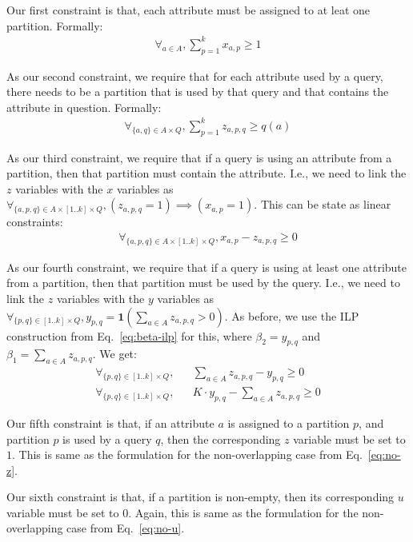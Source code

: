 Our first constraint is that, each attribute must be assigned to at leat one
partition. Formally:
\begin{eqnarray}
\forall_{a\in A}, \sum_{p=1}^{k} x_{a,p} \geq 1
\end{eqnarray}

As our second constraint, we require that for each attribute used by a query,
there needs to be a partition that is used by that query and that contains the
attribute in question. Formally:
\begin{eqnarray}
\forall_{\{a,q\}\in A\times Q}, \sum_{p=1}^{k} z_{a,p,q} \geq q(a) 
\end{eqnarray}

\begin{sloppypar}
As our third constraint, we require that if a query is using an attribute from
a partition, then that partition must contain the attribute. I.e., we need
to link the $z$ variables with the $x$ variables as
$\forall_{\{a,p,q\}\in A\times [1..k]\times Q}, (z_{a,p,q} = 1) \implies 
(x_{a,p} = 1)$. This can be state as linear constraints:
\begin{eqnarray}
\forall_{\{a,p,q\}\in A\times [1..k]\times Q}, x_{a,p} - z_{a,p,q} \geq 0 
\end{eqnarray}
\end{sloppypar}

As our fourth constraint, we require that if a query is using at least one
attribute from a partition, then that partition must be used by the query.
I.e., we need to link the $z$ variables with the $y$ variables as
$\forall_{\{p,q\}\in [1..k]\times Q}, y_{p,q} = \mathbf{1}(\sum_{a\in A}
z_{a,p,q}>0)$. As before, we use the ILP construction from
Eq.~\ref{eq:beta-ilp} for this, where $\beta_2=y_{p,q}$ and $\beta_1 =
\sum_{a\in A} z_{a,p,q}$. We get:
\begin{eqnarray}
\forall_{\{p,q\}\in [1..k]\times Q}, 
    &&  \sum_{a\in A} z_{a,p,q} - y_{p,q} \geq 0 \nonumber\\
\forall_{\{p,q\}\in [1..k]\times Q}, 
    &&  K\cdot y_{p,q} - \sum_{a\in A} z_{a,p,q} \geq 0 
\end{eqnarray}

Our fifth constraint is that, if an attribute $a$ is assigned to a partition
$p$, and partition $p$ is used by a query $q$, then the corresponding $z$
variable must be set to $1$. This is same as the formulation for the
non-overlapping case from Eq.~\ref{eq:no-z}.

Our sixth constraint is that, if a partition is non-empty, then its
corresponding $u$ variable must be set to $0$. Again, this is same as the
formulation for the non-overlapping case from Eq.~\ref{eq:no-u}.

